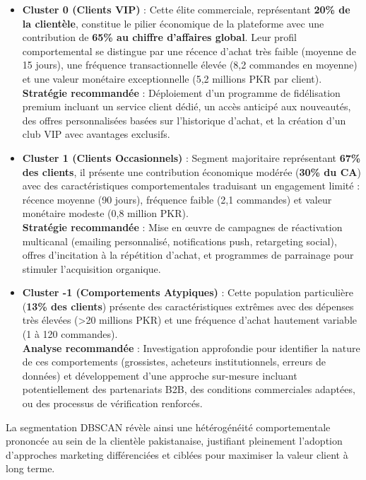 \documentclass[a4paper,12pt]{article}
\begin{document}
\begin{itemize}
    \item \textbf{Cluster 0 (Clients VIP)} : Cette élite commerciale, représentant \textbf{20\% de la clientèle}, constitue le pilier économique de la plateforme avec une contribution de \textbf{65\% au chiffre d'affaires global}. Leur profil comportemental se distingue par une récence d'achat très faible (moyenne de 15 jours), une fréquence transactionnelle élevée (8,2 commandes en moyenne) et une valeur monétaire exceptionnelle (5,2 millions PKR par client). \\
    \textbf{Stratégie recommandée} : Déploiement d'un programme de fidélisation premium incluant un service client dédié, un accès anticipé aux nouveautés, des offres personnalisées basées sur l'historique d'achat, et la création d'un club VIP avec avantages exclusifs.

    \item \textbf{Cluster 1 (Clients Occasionnels)} : Segment majoritaire représentant \textbf{67\% des clients}, il présente une contribution économique modérée (\textbf{30\% du CA}) avec des caractéristiques comportementales traduisant un engagement limité : récence moyenne (90 jours), fréquence faible (2,1 commandes) et valeur monétaire modeste (0,8 million PKR). \\
    \textbf{Stratégie recommandée} : Mise en œuvre de campagnes de réactivation multicanal (emailing personnalisé, notifications push, retargeting social), offres d'incitation à la répétition d'achat, et programmes de parrainage pour stimuler l'acquisition organique.

    \item \textbf{Cluster -1 (Comportements Atypiques)} : Cette population particulière (\textbf{13\% des clients}) présente des caractéristiques extrêmes avec des dépenses très élevées (>20 millions PKR) et une fréquence d'achat hautement variable (1 à 120 commandes). \\
    \textbf{Analyse recommandée} : Investigation approfondie pour identifier la nature de ces comportements (grossistes, acheteurs institutionnels, erreurs de données) et développement d'une approche sur-mesure incluant potentiellement des partenariats B2B, des conditions commerciales adaptées, ou des processus de vérification renforcés.
\end{itemize}

La segmentation DBSCAN révèle ainsi une hétérogénéité comportementale prononcée au sein de la clientèle pakistanaise, justifiant pleinement l'adoption d'approches marketing différenciées et ciblées pour maximiser la valeur client à long terme.
\end{document}
